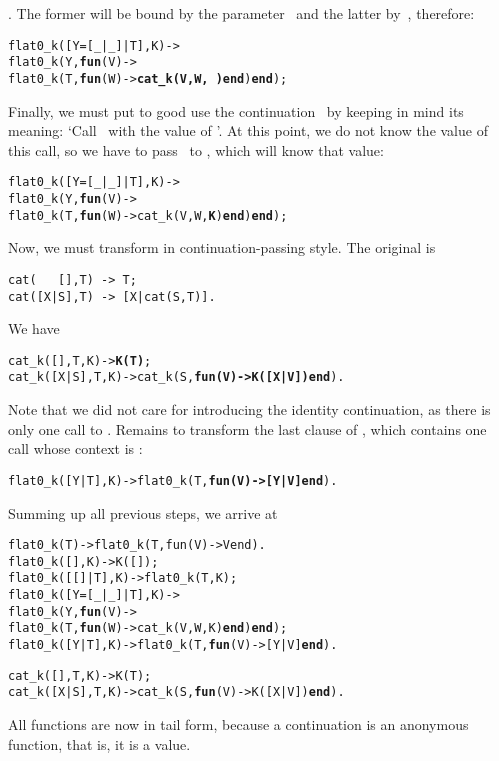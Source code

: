 . The former will be bound by the
parameter~ and the latter by~, therefore:
\begin{alltt}
flat0\_k([Y=[\_|\_]|T],K) ->
  flat0\_k(Y,\textbf{fun}(V) ->
              flat0\_k(T,\textbf{fun}(W) -> \textbf{cat\_k(V,W,\,)} \textbf{end}) \textbf{end});
\end{alltt}
Finally, we must put to good use the continuation~ by
keeping in mind its meaning: `Call~ with the value of
'. At this point, we do not know the
value of this call, so we have to pass~
to , which will know that value:
\begin{alltt}
flat0\_k([Y=[\_|\_]|T],K) ->
  flat0\_k(Y,\textbf{fun}(V) ->
              flat0\_k(T,\textbf{fun}(W) -> cat\_k(V,W,\textbf{K}) \textbf{end}) \textbf{end});
\end{alltt}
Now, we must transform  in continuation\hyp{}passing
style. The original  is
\begin{verbatim}
cat(   [],T) -> T;
cat([X|S],T) -> [X|cat(S,T)].
\end{verbatim}
We have
\begin{alltt}
cat\_k(   [],T,K) -> \textbf{K(T)};
cat\_k([X|S],T,K) -> cat\_k(S,\textbf{fun(V) -> K([X|V]) end}).
\end{alltt}
Note that we did not care for introducing the identity continuation,
as there is only one call to . Remains to transform
the last clause of , which contains one call whose
context is \erlcode{[Y|\textvisiblespace]}:
\begin{alltt}
flat0\_k(      [Y|T],K) -> flat0\_k(T,\textbf{fun(V) -> [Y|V] end}).
\end{alltt}
Summing up all previous steps, we arrive at
\begin{alltt}
flat0_k(T)             -> flat0_k(T,fun(V) -> V end).
flat0_k(         [],K) -> K([]);
flat0_k(     [[]|T],K) -> flat0_k(T,K);
flat0_k([Y=[_|_]|T],K) ->
  flat0_k(Y,\textbf{fun}(V) ->
              flat0_k(T,\textbf{fun}(W) -> cat_k(V,W,K) \textbf{end}) \textbf{end});
flat0_k(      [Y|T],K) -> flat0_k(T,\textbf{fun}(V) -> [Y|V] \textbf{end}).

cat_k(   [],T,K) -> K(T);
cat_k([X|S],T,K) -> cat_k(S,\textbf{fun}(V) -> K([X|V]) \textbf{end}).
\end{alltt}
All functions are now in tail form, because a continuation is an
anonymous function, that is, it is a value.


